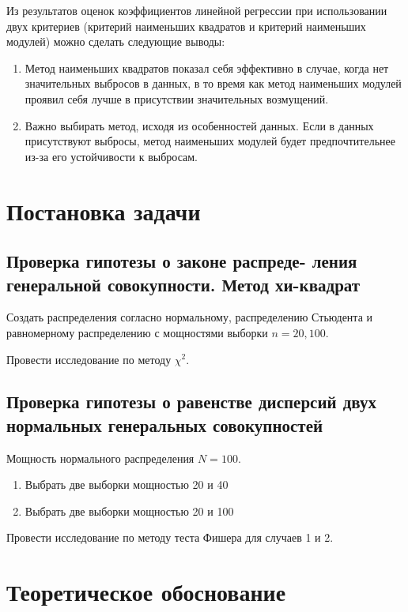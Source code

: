 \documentclass[12pt,a4paper]{article}
\begin{document}
	Из результатов оценок коэффициентов линейной регрессии при использовании
	двух критериев (критерий наименьших квадратов и критерий наименьших
	модулей) можно сделать следующие выводы:

	\begin{enumerate}
		\item Метод наименьших квадратов показал себя эффективно в случае,
		когда нет значительных выбросов в данных, в то время как метод
		наименьших модулей проявил себя лучше в присутствии значительных
		возмущений.
		\item Важно выбирать метод, исходя из особенностей данных. Если в
		данных присутствуют выбросы, метод наименьших модулей будет
		предпочтительнее из-за его устойчивости к выбросам.
	\end{enumerate}

	\section{Постановка задачи}

	\subsection{Проверка гипотезы о законе распреде- ления генеральной
		совокупности. Метод хи-квадрат}

	Создать распределения согласно нормальному, распределению Стьюдента и
	равномерному распределению с мощностями выборки \( n=20, 100 \).

	Провести исследование по методу \( \chi^2 \).

	\subsection{Проверка гипотезы о равенстве дисперсий двух нормальных
		генеральных совокупностей}

	Мощность нормального распределения \( N = 100 \).

	\begin{enumerate}
		\item Выбрать две выборки мощностью 20 и 40
		\item Выбрать две выборки мощностью 20 и 100
	\end{enumerate}

	Провести исследование по методу теста Фишера для случаев 1 и 2.

	\section{Теоретическое обоснование}
\end{document}
